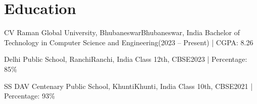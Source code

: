 \section{Education}
\resumeSubHeadingListStart

\resumeSubheading
{CV Raman Global University, Bhubaneswar}{Bhubaneswar, India}
{Bachelor of Technology in Computer Science and Engineering}{(2023 -- Present) | CGPA: 8.26 }

\resumeSubheading
{Delhi Public School, Ranchi}{Ranchi, India}
{Class 12th, CBSE}{2023 | Percentage: 85\%}

\resumeSubheading
{SS DAV Centenary Public School, Khunti}{Khunti, India}
{Class 10th, CBSE}{2021 | Percentage: 93\%}

\resumeSubHeadingListEnd
